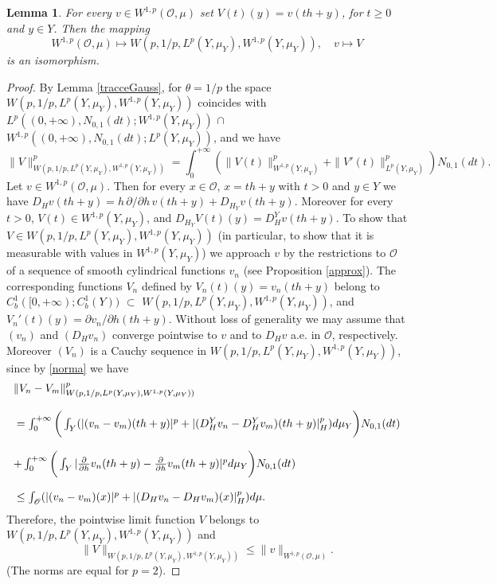 \documentclass[reqno,twoside,12pt]{amsart}
\newtheorem{Lemma}[Theorem]{Lemma}
\begin{document}
\begin{Lemma}
\label{Le:iso}
For every $v\in W^{1,p}({\mathcal O}, \mu)$ set $V(t)(y) =  v(th + y)$, for $t\geq 0$ and $y\in Y$. Then the mapping 
$$ W^{1,p}({\mathcal O}, \mu)\mapsto W(p, 1/p,  L^p(Y, \mu_Y),W^{1,p}(Y, \mu_Y)), 
\quad v\mapsto V $$
is an isomorphism. 
\end{Lemma}
\begin{proof}
By Lemma \ref{tracceGauss}, for $\theta =1/p$ the space $W(p, 1/p,  L^p(Y, \mu_Y),W^{1,p}(Y, \mu_Y))$ coincides with 
$L^p((0, +\infty),  N_{0,1}(dt);W^{1,p}(Y, \mu_Y))$ $\cap$ $W^{1,p}  ((0, +\infty), N_{0,1}(dt);L^p(Y, \mu_Y))$, and we have
\begin{equation}
\label{norma}
\|V\|_{W(p, 1/p,  L^p(Y, \mu_Y),W^{1,p}(Y, \mu_Y))}^p = \int_0^{+\infty} ( \|V(t)\|^p_{W^{1,p}(Y, \mu_Y)} + \|V'(t)\|^p_{L^{p}(Y, \mu_Y)} )N_{0,1}(dt). 
\end{equation} 
Let $v\in  W^{1,p}({\mathcal O}, \mu)$. Then for every $x\in {\mathcal O}$, $x = th + y$ with $t>0$ and $y\in Y$ we have $D_Hv(th+y) = h \, \partial/ \partial h\, v(th +y)  + D_{H_Y}v(th +y)$. Moreover  for every $t>0$, $V(t)\in W^{1,p}(Y, \mu_Y)$, and  $D_{H_Y}V(t)(y) =  D_{H}^Yv(th +y)$. To show that $V\in W(p, 1/p,  L^p(Y, \mu_Y),W^{1,p}(Y, \mu_Y))$ (in particular, to show that it is measurable with values in $W^{1,p}(Y, \mu_Y)$) we approach $v$ by the restrictions to ${\mathcal O}$ of a sequence of smooth cylindrical functions $v_n$ (see Proposition \ref{approx}). 
The corresponding functions $V_n$ defined by $V_n(t)(y) =  v_n(th + y)$ belong to 
$C^1_b([0, +\infty); C^1_b(Y))$ $\subset $ $W(p, 1/p,  L^p(Y, \mu_Y),W^{1,p}(Y, \mu_Y))$, and $V_n'(t)(y) = \partial v_n/\partial h(th+y)$. Without loss of generality we may assume that $(v_n)$ and $(D_Hv_n)$  converge pointwise to $v$ and to $D_Hv$ a.e. in ${\mathcal O}$, respectively. 
Moreover $(V_n)$ is a Cauchy sequence in $W(p, 1/p,  L^p(Y, \mu_Y),W^{1,p}(Y, \mu_Y))$, since by \eqref{norma}
we have
$$\begin{array}{l}
{\displaystyle} \|V_n-V_m\|_{W(p, 1/p,  L^p(Y, \mu_Y),W^{1,p}(Y, \mu_Y))}^p 
\\
\\
{\displaystyle} = \int_0^{+\infty} \bigg( \int_Y (|(v_n-v_m)(th+y)|^p + |(D_{H}^{Y}v_n - D_{H}^{Y}v_m)(th +y)|_{H}^p) d\mu_Y \bigg) N_{0,1}(dt)
\\
\\ 
+{\displaystyle}
\int_0^{+\infty}  \bigg( \int_Y    |\frac{\partial}{\partial h} v_n(th +y)- \frac{\partial}{\partial h} v_m(th +y)|^p 
d\mu_Y \bigg) N_{0,1}(dt)
\\
\\
{\displaystyle} \leq \int_{\mathcal O} (|(v_n-v_m)(x)|^p + |(D_{H} v_n-D_{H} v_m) (x)|_{H}^p  ) d\mu . 
\end{array}$$
Therefore, the pointwise limit function $V$ belongs to  
$W(p, 1/p, L^p(Y, \mu_Y),W^{1,p}(Y, \mu_Y))$ and 
$$\|V\|_{W(p, 1/p,  L^p(Y, \mu_Y),W^{1,p}(Y, \mu_Y))} \leq  \|v\|_{W^{1,p}({\mathcal O}, \mu)}. $$
(The norms are  equal  for $p=2$). 


\end{proof}
\end{document}
